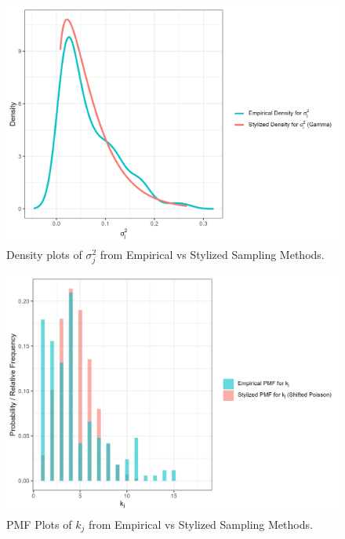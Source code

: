 \begin{figure}[H]
    \centering
    \vspace{-5pt}
    \includegraphics[width=\linewidth]{chapters/plots/densitysigma_j_sq.png}
    \caption{Density plots of $\sigma_j^2$ from Empirical vs Stylized Sampling Methods. \label{fig:densitysigma_sq}}
    \vspace{-5pt}
\end{figure}


\begin{figure}[H]
    \centering
    \vspace{-5pt}
    \includegraphics[width=\linewidth]{chapters/plots/pmfkj.png}
    \caption{PMF Plots of $k_j$ from Empirical vs Stylized Sampling Methods. \label{fig:pmfkj}}
    \vspace{-5pt}
\end{figure}

